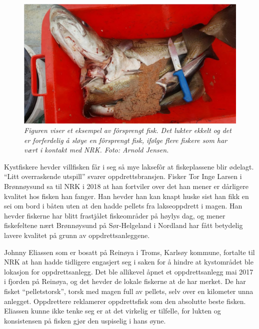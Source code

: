 \begin{figure} 
\begin{center} 
\includegraphics[scale=0.2]{figures/forsprengt}
\caption{\small \sl Figuren viser et eksempel av fôrsprengt fisk. Det lukter ekkelt og det er forferdelig å sløye en fôrsprengt fisk, ifølge flere fiskere som har vært i kontakt med NRK. Foto: Arnold Jensen. \cite{Trana m.fl. 2019} \label{fig:forsprengt}} 
\end{center} 
\end{figure} 

Kystfiskere hevder villfisken får i seg så mye laksefôr at fiskeplassene blir ødelagt. ``Litt overraskende utspill'' svarer oppdrettsbransjen. Fisker Tor Inge Larsen i Brønnøysund sa til NRK i 2018 at han fortviler over det han mener er dårligere kvalitet hos fisken han fanger. Han hevder han kan knapt huske sist han fikk en sei om bord i båten uten at den hadde pellets fra lakseoppdrett i magen. Han hevder fiskerne har blitt frastjålet fiskeområder på høylys dag, og mener fiskefeltene nært Brønnøysund på Sør-Helgeland i Nordland har fått betydelig lavere kvalitet på grunn av oppdrettsanleggene. \cite{Olsen m.fl. 2018}

Johnny Eliassen som er bosatt på Reinøya i Troms, Karlsøy kommune, fortalte til NRK at han hadde tidligere engasjert seg i saken for å hindre at kystområdet ble lokasjon for oppdrettsanlegg. Det ble allikevel åpnet et oppdrettsanlegg mai 2017 i fjorden på Reinøya, og det hevder de lokale fiskerne at de har merket. De har fisket ``pelletstorsk'',  torsk med magen full av pellets, selv over en kilometer unna anlegget. Oppdrettere reklamerer oppdrettsfisk som den absolutte beste fisken. Eliassen kunne ikke tenke seg er at det virkelig er tilfelle, for lukten og konsistensen på fisken gjør den uspiselig i hans øyne. \cite{Jakobsen 2017}

